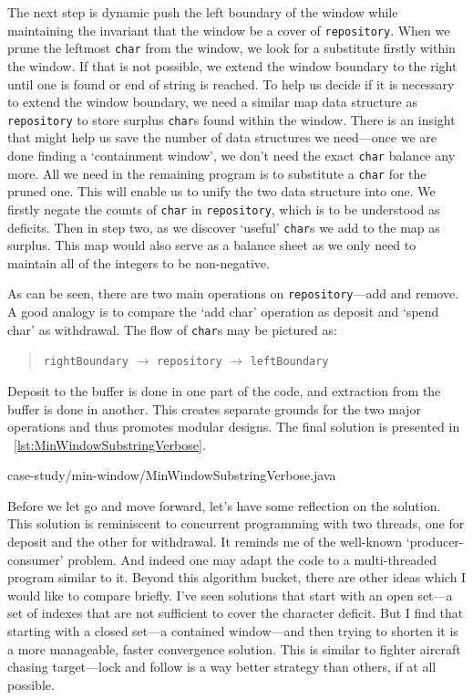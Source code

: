 \documentclass[oneside,11pt]{book}
\theoremstyle{definition}
\theoremstyle{remark}
\newcommand{\code}[1]{\mbox{\lstinline{#1}}}
\begin{document}
The next step is dynamic push the left boundary of the window while maintaining the invariant
that the window be a cover of \code{repository}.
When we prune the leftmost \code{char} from the window, we look for a substitute firstly within the
window.
If that is not possible, we extend the window boundary to the right until one is found or end of
string is reached.
To help us decide if it is necessary to extend the window boundary,
we need a similar map data structure as \code{repository} to store surplus \code{char}s found within the
window.
There is an insight that might help us save the number of data structures we need---once we are
done finding a `containment window', we don't need the exact \code{char} balance
any more.
All we need in the remaining program is to substitute a \code{char} for the pruned one.
This will enable us to unify the two data structure into one.
We firstly negate the counts of \code{char} in \code{repository}, which is to be understood as deficits.
Then in step two, as we discover `useful' \code{char}s we add to the map as surplus.
This map would also serve as a balance sheet as we only need to maintain all of the integers to
be non-negative.

As can be seen, there are two main operations on \code{repository}---add and remove.
A good analogy is to compare the `add char' operation as deposit and `spend char' as withdrawal.
The flow of \code{char}s may be pictured as:
\begin{quote}
    \code{rightBoundary} $\rightarrow$ \code{repository} $\rightarrow$ \code{leftBoundary}
\end{quote}
Deposit to the buffer is done in one part of the code, and extraction from the buffer is done in
another.
This creates separate grounds for the two major operations and thus promotes modular designs.
The final solution is presented in ~\autoref{lst:MinWindowSubstringVerbose}.


{case-study/min-window/MinWindowSubstringVerbose.java}

Before we let go and move forward, let's have some reflection on the solution.
This solution is reminiscent to concurrent programming with two threads, one for deposit
and the other for withdrawal.
It reminds me of the well-known `producer-consumer' problem.
And indeed one may adapt the code to a multi-threaded program similar to it.
Beyond this algorithm bucket, there are other ideas which I would like to compare briefly.
I've seen solutions that start with an open set---a set of indexes that are not
sufficient to cover the character deficit.
But I find that starting with a closed set---a contained window---and then trying
to shorten it is a more manageable, faster convergence solution.
This is similar to fighter aircraft chasing target---lock and follow is a way better strategy
than others, if at all possible.
\end{document}
